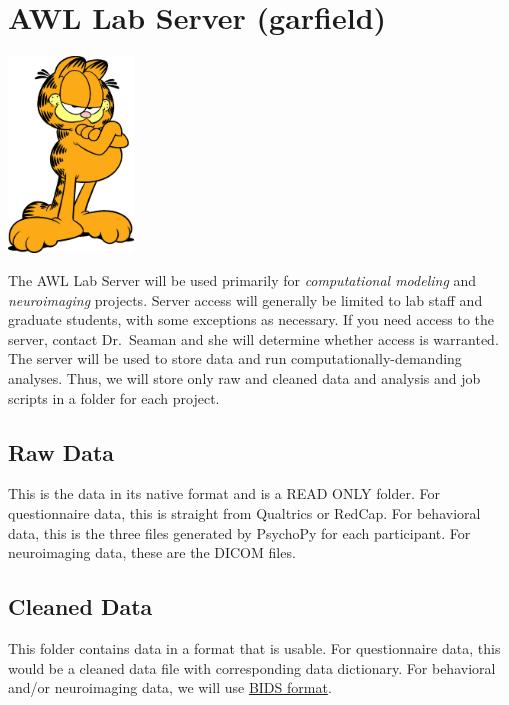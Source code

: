 \documentclass[]{book}
\begin{document}
\hypertarget{awl-lab-server-garfield}{%
\section{AWL Lab Server (garfield)}\label{awl-lab-server-garfield}}

\includegraphics[width=0.25\textwidth,height=\textheight]{images/garfield.jpeg}

The AWL Lab Server will be used primarily for \emph{computational modeling} and \emph{neuroimaging} projects. Server access will generally be limited to lab staff and graduate students, with some exceptions as necessary. If you need access to the server, contact Dr.~Seaman and she will determine whether access is warranted. The server will be used to store data and run computationally-demanding analyses. Thus, we will store only raw and cleaned data and analysis and job scripts in a folder for each project.

\hypertarget{raw-data}{%
\subsection{Raw Data}\label{raw-data}}

This is the data in its native format and is a READ ONLY folder. For questionnaire data, this is straight from Qualtrics or RedCap. For behavioral data, this is the three files generated by PsychoPy for each participant. For neuroimaging data, these are the DICOM files.

\hypertarget{cleaned-data}{%
\subsection{Cleaned Data}\label{cleaned-data}}

This folder contains data in a format that is usable. For questionnaire data, this would be a cleaned data file with corresponding data dictionary. For behavioral and/or neuroimaging data, we will use \href{https://bids.neuroimaging.io/}{BIDS format}.
\end{document}
